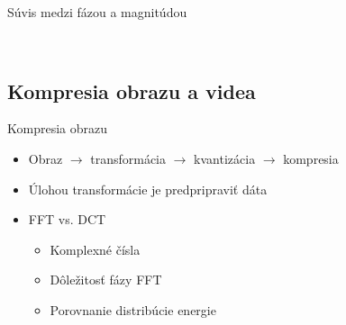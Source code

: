 \documentclass{beamer}
\begin{document}
\begin{frame}{Súvis medzi fázou a magnitúdou}
\begin{figure}
\begin{centering}
        \\
        \end{centering}
    \end{figure}
\end{frame}

\def\sipka{\rightarrow}

\subsection{Kompresia obrazu a videa}
\begin{frame}{Kompresia obrazu}
    \begin{itemize}
        \item Obraz $\sipka$ transformácia $\sipka$ kvantizácia
          $\sipka$ kompresia
        \item Úlohou transformácie je predpripraviť dáta
        \item FFT vs. DCT
            \begin{itemize}
                \item Komplexné čísla
                \item Dôležitosť fázy FFT
                \item Porovnanie distribúcie energie
            \end{itemize}
    \end{itemize}
\end{frame}
\end{document}

